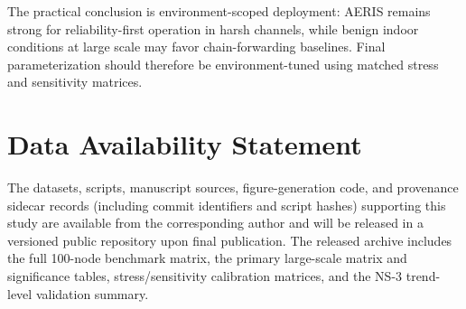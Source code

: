 ﻿\documentclass[sensors,article,submit,moreauthors,pdftex]{Definitions/mdpi}
\begin{document}
The practical conclusion is environment-scoped deployment: AERIS remains strong for reliability-first operation in harsh channels, while benign indoor conditions at large scale may favor chain-forwarding baselines. Final parameterization should therefore be environment-tuned using matched stress and sensitivity matrices.

\section*{Data Availability Statement}
The datasets, scripts, manuscript sources, figure-generation code, and provenance sidecar records (including commit identifiers and script hashes) supporting this study are available from the corresponding author and will be released in a versioned public repository upon final publication. The released archive includes the full 100-node benchmark matrix, the primary large-scale matrix and significance tables, stress/sensitivity calibration matrices, and the NS-3 trend-level validation summary.


\end{document}
